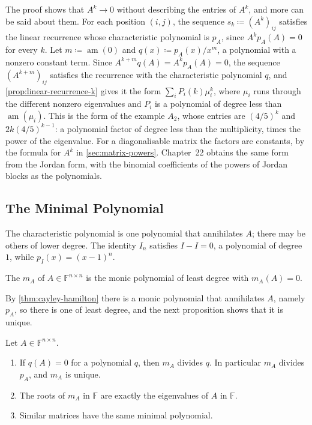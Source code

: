 The proof shows that $A^k\to0$ without describing the entries of $A^k$, and more can be said about them. For each position $(i,j)$, the sequence $s_k\coloneqq(A^k)_{ij}$ satisfies the linear recurrence whose characteristic polynomial is $p_A$, since $A^kp_A(A)=0$ for every $k$. Let $m\coloneqq\operatorname{am}(0)$ and $q(x)\coloneqq p_A(x)/x^m$, a polynomial with a nonzero constant term. Since $A^{k+m}q(A)=A^kp_A(A)=0$, the sequence $(A^{k+m})_{ij}$ satisfies the recurrence with the characteristic polynomial $q$, and \cref{prop:linear-recurrence-k} gives it the form $\sum_iP_i(k)\mu_i^k$, where $\mu_i$ runs through the different nonzero eigenvalues and $P_i$ is a polynomial of degree less than $\operatorname{am}(\mu_i)$. This is the form of the example $A_2$, whose entries are $(4/5)^k$ and $2k(4/5)^{k-1}$: a polynomial factor of degree less than the multiplicity, times the power of the eigenvalue. For a diagonalisable matrix the factors are constants, by the formula for $A^k$ in \cref{sec:matrix-powers}. Chapter~22 obtains the same form from the Jordan form, with the binomial coefficients of the powers of Jordan blocks as the polynomials.

\subsection{The Minimal Polynomial}

The characteristic polynomial is one polynomial that annihilates $A$; there may be others of lower degree. The identity $I_n$ satisfies $I-I=0$, a polynomial of degree $1$, while $p_I(x)=(x-1)^n$.

\begin{definition}
\label{def:minimal-polynomial}
The  $m_A$ of $A\in\mathbb F^{n\times n}$ is the monic polynomial of least degree with $m_A(A)=0$.
\end{definition}

By \cref{thm:cayley-hamilton} there is a monic polynomial that annihilates $A$, namely $p_A$, so there is one of least degree, and the next proposition shows that it is unique.

\begin{proposition}
\label{prop:minimal-polynomial}
Let $A\in\mathbb F^{n\times n}$.
\begin{enumerate}
\item If $q(A)=0$ for a polynomial $q$, then $m_A$ divides $q$. In particular $m_A$ divides $p_A$, and $m_A$ is unique.
\item The roots of $m_A$ in $\mathbb F$ are exactly the eigenvalues of $A$ in $\mathbb F$.
\item Similar matrices have the same minimal polynomial.
\end{enumerate}
\end{proposition}

